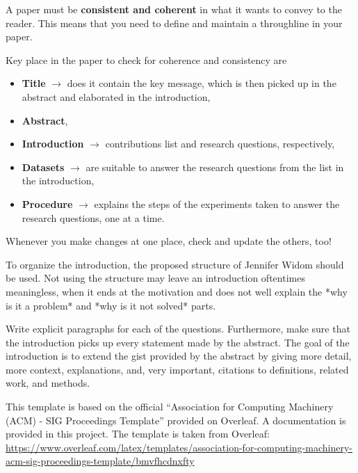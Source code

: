 \documentclass[sigconf, review, nonacm]{acmart}
\begin{document}
\begin{tcolorbox}[title=Have a throughline in your paper and maintain it!,colback=red!20]
    A paper must be \textbf{consistent and coherent} in what it wants to convey to the reader.
    This means that you need to define and maintain a throughline in your paper.

    Key place in the paper to check for coherence and consistency are
    \begin{itemize}
        \item \textbf{Title} $\rightarrow$ does it contain the key message, which is then picked up in the abstract and elaborated in the introduction, 
        \item \textbf{Abstract}, 
        \item \textbf{Introduction} $\rightarrow$ contributions list and research questions, respectively, 
        \item \textbf{Datasets} $\rightarrow$  are suitable to answer the research questions from the list in the introduction,
        \item \textbf{Procedure} $\rightarrow$ explains the steps of the experiments taken to answer the research questions, one at a time.
    \end{itemize}


    Whenever you make changes at one place, check and update the others, too!
\end{tcolorbox}


\begin{tcolorbox}[title=Instructions: Write following this structure.]

To organize the introduction, the proposed structure of Jennifer Widom should be used. 
Not using the structure may leave an introduction oftentimes meaningless, when it ends at the motivation and does not well explain the *why is it a problem* and *why is it not solved* parts.

Write explicit paragraphs for each of the questions. 
Furthermore, make sure that the introduction picks up every statement made by the abstract.
The goal of the introduction is to extend the gist provided by the abstract by giving more detail, more context, explanations, and, very important, citations to definitions, related work, and methods.
\end{tcolorbox}

This template is based on the official ``Association for Computing Machinery (ACM) - SIG Proceedings Template'' provided on Overleaf. A documentation is provided in this project. The template is taken from Overleaf:
\url{https://www.overleaf.com/latex/templates/association-for-computing-machinery-acm-sig-proceedings-template/bmvfhcdnxfty}
\end{document}
